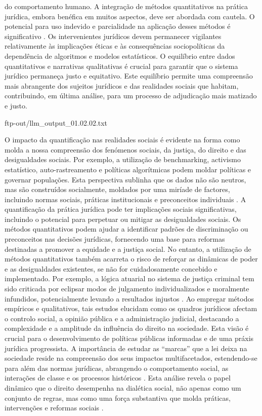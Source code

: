 \begin{agradecimentos}
do comportamento humano. A integração de métodos quantitativos na prática jurídica, embora benéfica em muitos aspectos, deve ser abordada com cautela. O potencial para uso indevido e parcialidade na aplicação desses métodos é significativo \cite{jurimetricschallenges}. Os intervenientes jurídicos devem permanecer vigilantes relativamente às implicações éticas e às consequências sociopolíticas da dependência de algoritmos e modelos estatísticos. O equilíbrio entre dados quantitativos e narrativas qualitativas é crucial para garantir que o sistema jurídico permaneça justo e equitativo. Este equilíbrio permite uma compreensão mais abrangente dos sujeitos jurídicos e das realidades sociais que habitam, contribuindo, em última análise, para um processo de adjudicação mais matizado e justo. 
    
    ftp-out/llm_output_01.02.02.txt 
    
    O impacto da quantificação nas realidades sociais é evidente na forma como molda a nossa compreensão dos fenómenos sociais, da justiça, do direito e das desigualdades sociais. Por exemplo, a utilização de benchmarking, activismo estatístico, auto-rastreamento e políticas algorítmicas podem moldar políticas e governar populações. Esta perspectiva sublinha que os dados não são neutros, mas são construídos socialmente, moldados por uma miríade de factores, incluindo normas sociais, práticas institucionais e preconceitos individuais \cite{101057s4159902003965}. A quantificação da prática jurídica pode ter implicações sociais significativas, incluindo o potencial para perpetuar ou mitigar as desigualdades sociais. Os métodos quantitativos podem ajudar a identificar padrões de discriminação ou preconceitos nas decisões jurídicas, fornecendo uma base para reformas destinadas a promover a equidade e a justiça social. No entanto, a utilização de métodos quantitativos também acarreta o risco de reforçar as dinâmicas de poder e as desigualdades existentes, se não for cuidadosamente concebido e implementado. Por exemplo, a lógica atuarial no sistema de justiça criminal tem sido criticada por eclipsar modos de julgamento individualizados e moralmente infundidos, potencialmente levando a resultados injustos \cite{101111lsi12334}. Ao empregar métodos empíricos e qualitativos, tais estudos elucidam como os quadros jurídicos afectam o controlo social, a opinião pública e a administração judicial, destacando a complexidade e a amplitude da influência do direito na sociedade. Esta visão é crucial para o desenvolvimento de políticas públicas informadas e de uma práxis jurídica progressista. A importância de estudar as “marcas” que a lei deixa na sociedade reside na compreensão dos seus impactos multifacetados, estendendo-se para além das normas jurídicas, abrangendo o comportamento social, as interações de classe e os processos históricos \cite{law1982, calvo2024}. Esta análise revela o papel dinâmico que o direito desempenha na dialética social, não apenas como um conjunto de regras, mas como uma força substantiva que molda práticas, intervenções e reformas sociais \cite{law1982}. 
    

\end{agradecimentos}
